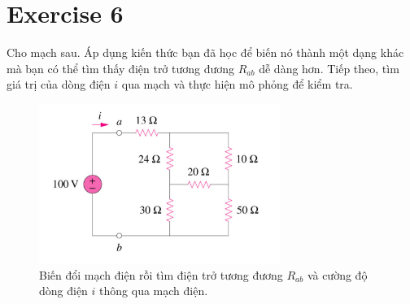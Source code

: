 \section{Exercise 6}
Cho mạch sau. Áp dụng kiến thức bạn đã học để biến nó thành một dạng khác mà bạn có thể tìm thấy điện trở tương đương \(R_{ab}\) dễ dàng hơn. Tiếp theo, tìm
giá trị của dòng điện \(i\) qua mạch và thực hiện mô phỏng để kiểm tra.
\begin{figure}[!htbp]
    \centering
    \includegraphics[width=0.7\textwidth]{graphics/ex6/f1.png}
    \caption{Biến đổi mạch điện rồi tìm điện trở tương đương \(R_{ab}\) và cường độ dòng điện
    \(i\) thông qua mạch điện.}
    \end{figure}
